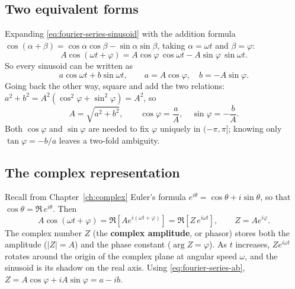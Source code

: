 \subsection{Two equivalent forms}

Expanding \cref{eq:fourier-series-sinusoid} with the addition formula $\cos(\alpha+\beta)=\cos\alpha\cos\beta-\sin\alpha\sin\beta$, taking $\alpha=\omega t$ and $\beta=\varphi$:
\begin{equation}
A\cos(\omega t+\varphi)=A\cos\varphi\,\cos\omega t-A\sin\varphi\,\sin\omega t .
\end{equation}
So every sinusoid can be written as
\begin{equation}
a\cos\omega t+b\sin\omega t,\qquad a=A\cos\varphi,\quad b=-A\sin\varphi .
\label{eq:fourier-series-ab}
\end{equation}
Going back the other way, square and add the two relations: $a^2+b^2=A^2(\cos^2\varphi+\sin^2\varphi)=A^2$, so
\begin{equation}
A=\sqrt{a^2+b^2},\qquad \cos\varphi=\frac{a}{A},\quad \sin\varphi=-\frac{b}{A}.
\label{eq:fourier-series-Aphi}
\end{equation}
Both $\cos\varphi$ and $\sin\varphi$ are needed to fix $\varphi$ uniquely in $(-\pi,\pi]$; knowing only $\tan\varphi=-b/a$ leaves a two-fold ambiguity.

\subsection{The complex representation}

Recall from Chapter~\ref{ch:complex} Euler's formula $e^{i\theta}=\cos\theta+i\sin\theta$, so that $\cos\theta=\Re\, e^{i\theta}$. Then
\begin{equation}
A\cos(\omega t+\varphi)=\Re\!\left[A e^{i(\omega t+\varphi)}\right]=\Re\!\left[Z\,e^{i\omega t}\right],\qquad Z=Ae^{i\varphi}.
\label{eq:fourier-series-phasor}
\end{equation}
The complex number $Z$ (the \textbf{complex amplitude}, or phasor) stores both the amplitude ($|Z|=A$) and the phase constant ($\arg Z=\varphi$). As $t$ increases, $Ze^{i\omega t}$ rotates around the origin of the complex plane at angular speed $\omega$, and the sinusoid is its shadow on the real axis. Using \cref{eq:fourier-series-ab}, $Z=A\cos\varphi+iA\sin\varphi=a-ib$.

